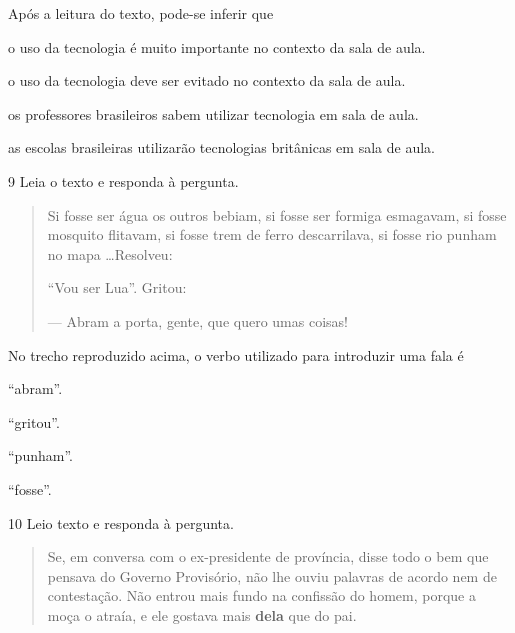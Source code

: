 Após a leitura do texto, pode-se inferir que

\begin{escolha}
  \item o uso da tecnologia é muito importante no contexto da sala de aula.

  \item o uso da tecnologia deve ser evitado no contexto da sala de aula.

  \item os professores brasileiros sabem utilizar tecnologia em sala de aula.

  \item as escolas brasileiras utilizarão tecnologias britânicas em sala de
aula.
\end{escolha}



\num{9} Leia o texto e responda à pergunta.

\begin{quote}
Si fosse ser água os outros bebiam, si fosse ser formiga esmagavam, si
fosse mosquito flitavam, si fosse trem de ferro descarrilava, si fosse
rio punham no mapa \ldots Resolveu:

``Vou ser Lua''. Gritou:

--- Abram a porta, gente, que quero umas coisas!

\end{quote}

No trecho reproduzido acima, o verbo utilizado para introduzir uma fala
é

\begin{escolha}
  \item ``abram''.

  \item ``gritou''.

  \item ``punham''.

  \item ``fosse''.
\end{escolha}

\num{10} Leio texto e responda à pergunta.

\begin{quote}
Se, em conversa com o ex-presidente de província, disse todo o bem que
pensava do Governo Provisório, não lhe ouviu palavras de acordo nem de
contestação. Não entrou mais fundo na confissão do homem, porque a moça
o atraía, e ele gostava mais \textbf{dela} que do pai.

\end{quote}

